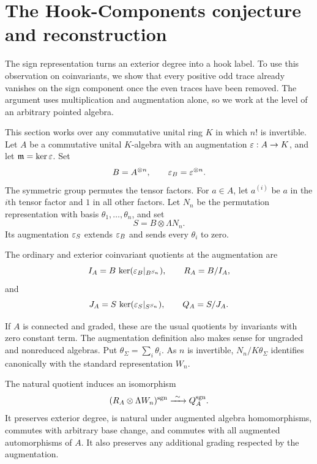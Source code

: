 \section{The Hook-Components conjecture and reconstruction}
\label{sec:augmented}

The sign representation turns an exterior degree into a hook label.
To use this observation on coinvariants, we show that every
positive odd trace already vanishes on the sign component once the
even traces have been removed.  The argument uses multiplication
and augmentation alone, so we work at the level of an arbitrary
pointed algebra.

This section works over any commutative unital ring $K$ in which $n!$ is
invertible.  Let $A$ be a commutative unital $K$-algebra
with an augmentation $\varepsilon:A\to K$, and let
$\mathfrak m=\ker\varepsilon$.  Set
\[
 B=A^{\otimes n},\qquad
 \varepsilon_B=\varepsilon^{\otimes n}.
\]
The symmetric group permutes the tensor factors.
For $a\in A$, let $a^{(i)}$ be $a$ in the $i$th tensor
factor and $1$ in all other factors.
Let $N_n$ be the permutation representation with basis
$\theta_1,\ldots,\theta_n$, and set
\[
 S=B\otimes\Lambda N_n.
\]
Its augmentation $\varepsilon_S$ extends $\varepsilon_B$ and sends
every $\theta_i$ to zero.

\begin{definition}\label{def:augmented-coinvariants}
The ordinary and exterior coinvariant quotients at the
augmentation are
\[
 I_A=B\,\ker(\varepsilon_B|_{B^{S_n}}),\qquad R_A=B/I_A,
\]
and
\[
 J_A=S\,\ker(\varepsilon_S|_{S^{S_n}}),\qquad Q_A=S/J_A.
\]
\end{definition}

If $A$ is connected and graded, these are the usual
quotients by invariants with zero constant term.
The augmentation definition also makes sense for
ungraded and nonreduced algebras.
Put $\theta_\Sigma=\sum_i\theta_i$.
As $n$ is invertible, $N_n/K\theta_\Sigma$ identifies
canonically with the standard representation $W_n$.

\begin{theorem}\label{thm:augmented-transfer}
The natural quotient induces an isomorphism
\begin{equation}\label{eq:augmented-transfer}
 (R_A\otimes\Lambda W_n)^{\operatorname{sgn}}
       \xrightarrow{\ \sim\ }Q_A^{\operatorname{sgn}}.
\end{equation}
It preserves exterior degree, is natural under augmented
algebra homomorphisms, commutes with arbitrary base change, and
commutes with all augmented
automorphisms of $A$.  It also preserves any additional
grading respected by the augmentation.
\end{theorem}

